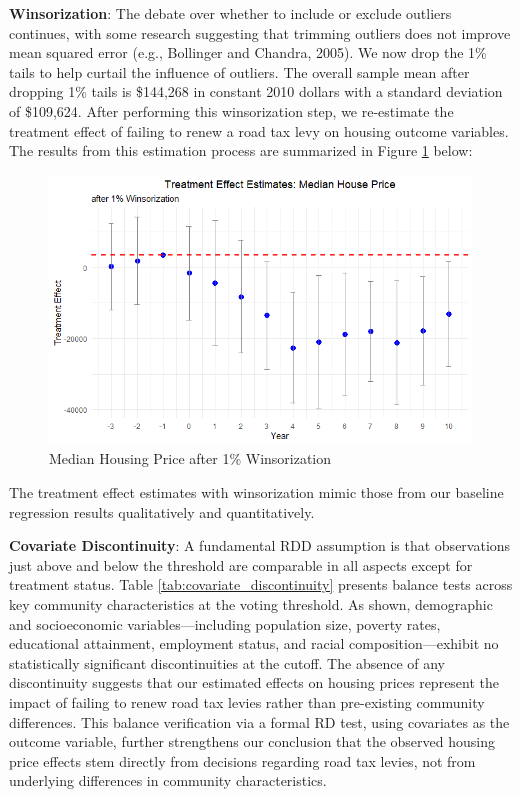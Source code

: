 \textbf{Winsorization}: The debate over whether to include or exclude outliers continues, with some research suggesting that trimming outliers does not improve mean squared error (e.g., Bollinger and Chandra, 2005).  We now drop the 1\% tails to help curtail the influence of outliers. The overall sample mean after dropping 1\% tails is \$144,268 in constant 2010 dollars with a standard deviation of \$109,624. After performing this winsorization step, we re-estimate the treatment effect of failing to renew a road tax levy on housing outcome variables. The results from this estimation process are summarized in Figure \ref{fig:tes_g_w} below:

\begin{figure}[htbp]
    \centering
    \includegraphics[width=\textwidth,keepaspectratio]{images/tes_g_w_reg.png}    
    \caption{Median Housing Price after 1\% Winsorization}
    \label{fig:tes_g_w}
\end{figure}

The treatment effect estimates with winsorization mimic those from our baseline regression results qualitatively and quantitatively.

\textbf{Covariate Discontinuity}: A fundamental RDD assumption is that observations just above and below the threshold are comparable in all aspects except for treatment status. Table \ref{tab:covariate_discontinuity} presents balance tests across key community characteristics at the voting threshold. As shown, demographic and socioeconomic variables—including population size, poverty rates, educational attainment, employment status, and racial composition—exhibit no statistically significant discontinuities at the cutoff. The absence of any discontinuity suggests that our estimated effects on housing prices represent the impact of failing to renew road tax levies rather than pre-existing community differences. This balance verification via a formal RD test, using covariates as the outcome variable, further strengthens our conclusion that the observed housing price effects stem directly from decisions regarding road tax levies, not from underlying differences in community characteristics.

